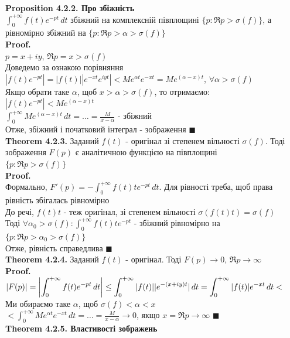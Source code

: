 \documentclass[a4paper, 14pt]{extarticle}
\def\hugespace{\vspace{5mm} \\}
\begin{document}
\textbf{Proposition 4.2.2. Про збіжність}\\
$\displaystyle \int_0^{+\infty} f(t)e^{-pt}\,dt$ збіжний на комплексній півплощині $\{p: \Re p>\sigma(f)\}$, а рівномірно збіжний на $\{p: \Re p>\alpha>\sigma(f)\}$\\
\textbf{Proof.}\\
$p = x + iy$, $\Re p = x > \sigma(f)$\\
Доведемо за ознакою порівняння\\
$|f(t)e^{-pt}| = |f(t)| |e^{-xt}e^{iyt}| < Me^{\alpha t} e^{-xt} = Me^{(\alpha - x)t}$, $\forall \alpha > \sigma(f)$\\
Якщо обрати таке $\alpha$, щоб $x>\alpha>\sigma(f)$, то отримаємо:\\
$|f(t)e^{-pt}| < Me^{(\alpha-x)t}$\\
$\displaystyle \int_0^{+\infty} Me^{(\alpha-x)t}\,dt = \dots = \frac{M}{x-\alpha}$ - збіжний\\
Отже, збіжний і початковий інтеграл - зображення $\blacksquare$
\hugespace
\textbf{Theorem 4.2.3.} Заданий $f(t)$ - оригінал зі степенем вільності $\sigma(f)$. Тоді зображення $F(p)$ є аналітичною функцією на півплощині \\ $\{p: \Re p>\sigma(f)\}$\\
\textbf{Proof.}\\
Формально, $F'(p) = \displaystyle -\int_0^{+\infty} f(t) t e^{-pt}\,dt$. Для рівності треба, щоб права рівність збігалась рівномірно\\
До речі, $f(t)t$ - теж оригінал, зі степенем вільності $\sigma(f(t)t)=\sigma(f)$\\
Тоді $\forall \alpha_0 > \sigma(f): \displaystyle \int_0^{+\infty} f(t)te^{-pt}$ - збіжний рівномірно на $\{p: \Re p > \alpha_0 > \sigma(f) \}$\\
Отже, рівність справедлива $\blacksquare$
\hugespace
\textbf{Theorem 4.2.4.} Заданий $f(t)$ - оригінал. Тоді $F(p) \to 0$, $\Re p \to \infty$\\
\textbf{Proof.}\\
$|F(p)| = \displaystyle \abs{\int_0^{+\infty} f(t)e^{-pt}\,dt} \leq \int_0^{+\infty} |f(t)| |e^{-(x+iy)t}| \,dt = \int_0^{+\infty} |f(t)|e^{-xt}\,dt <$\\
Ми обираємо таке $\alpha$, щоб $\sigma(f) < \alpha < x$\\
$< \displaystyle \int_0^{+\infty} Me^{\alpha t} e^{-xt}\,dt = \dots = \frac{M}{x-\alpha} \to 0$, якщо $x = \Re p \to \infty$ $\blacksquare$
\hugespace
\textbf{Theorem 4.2.5. Властивості зображень}\\
\end{document}
